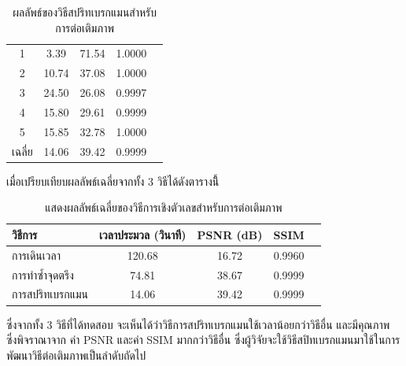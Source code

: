 \documentclass[hidelinks, a4paper,12pt]{article}
\numberwithin{equation}{section}							%
\numberwithin{equation}{section}
\begin{document}
{\begin{table}[H]
\begin{tabular}[ht]{|c|c|c|c|c|}
		\hline
		1 & 3.39 & 71.54 & 1.0000 \\ 
		2 & 10.74 & 37.08 & 1.0000 \\
		3 &  24.50 & 26.08 & 0.9997 \\
		4 & 15.80  & 29.61  & 0.9999 \\
		5 & 15.85  & 32.78  & 1.0000 \\
		\hline
		เฉลี่ย & 14.06  & 39.42  & 0.9999 \\
		\hline
	\end{tabular}
	\caption{ผลลัพธ์ของวิธีสปริทเบรกแมนสำหรับการต่อเติมภาพ}
\end{table}
	เมื่อเปรียบเทียบผลลัพธ์เฉลี่ยจากทั้ง 3 วิธีได้ดังตารางนี้ิ
	\begin{table}[H]
		\centering
		\begin{tabular}[ht]{|l|c|c|c|c|}
			\hline
			วิธีการ  & เวลาประมวล  (วินาที) & PSNR (dB) & SSIM \\
			\hline
			การเดินเวลา & 120.68 & 16.72 & 0.9960 \\
			การทำซ้ำจุดตรึง & 74.81 & 38.67 & 0.9999 \\
			การสปริทเบรกแมน & 14.06 & 39.42 & 0.9999  \\
			\hline
		\end{tabular}
		\caption{แสดงผลลัพธ์เฉลี่ยของวิธีการเชิงตัวเลขสำหรับการต่อเติมภาพ}
	\end{table}	
	\hspace{1cm} 
	ซึ่งจากทั้ง 3 วิธีที่ได้ทดสอบ จะเห็นได้ว่าวิธีการสปริทเบรกแมนใช้เวลาน้อยกว่าวิธีอื่น และมีคุณภาพ ซึ่งพิจราณาจาก ค่า PSNR และค่า SSIM มากกว่าวิธีอื่น ซึ่งผู้วิจัยจะใช้วิธีสปิทเบรกแมนมาใช้ในการพัฒนาวิธีต่อเติมภาพเป็นลำดับถัดไป
	
}
\end{document}
